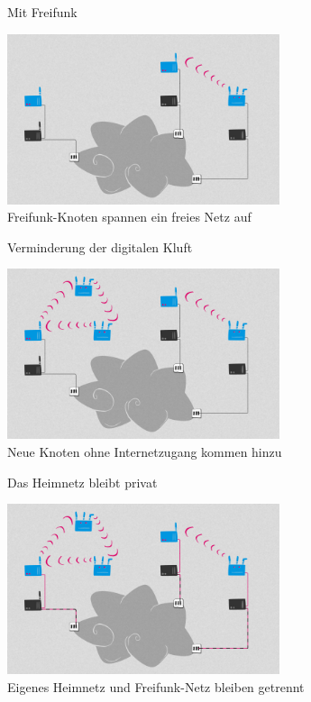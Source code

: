 \documentclass[10pt]{beamer}
\begin{document}
  \begin{frame}{Mit Freifunk}
    \begin{center}
      \includegraphics[height=5cm]{images/network_2}\\
      \vspace{1em}
      Freifunk-Knoten spannen ein freies Netz auf
      \vspace{1em}
    \end{center}
  \end{frame}
  
  \begin{frame}{Verminderung der digitalen Kluft}
    \begin{center}
      \includegraphics[height=5cm]{images/network_3}\\
      \vspace{1em}
      Neue Knoten ohne Internetzugang kommen hinzu
      \vspace{1em}
    \end{center}
  \end{frame}
  
  \begin{frame}{Das Heimnetz bleibt privat}
    \begin{center}
      \includegraphics[height=5cm]{images/network_4}\\
      \vspace{1em}
      Eigenes Heimnetz und Freifunk-Netz bleiben getrennt
      \vspace{1em}
    \end{center}
  \end{frame}
\end{document}
